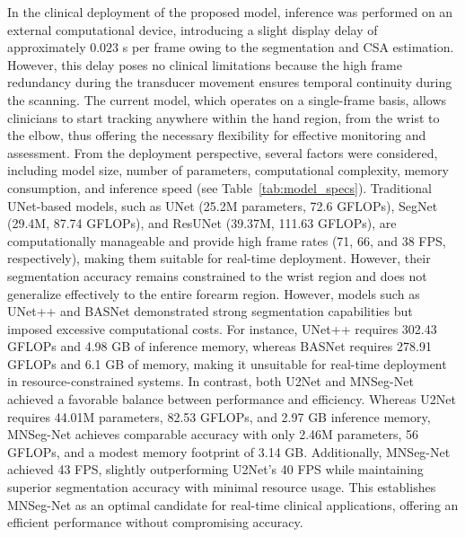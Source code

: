 In the clinical deployment of the proposed model, inference was performed on an external computational device, introducing a slight display delay of approximately $0.023$ s per frame owing to the segmentation and CSA estimation. However, this delay poses no clinical limitations because the high frame redundancy during the transducer movement ensures temporal continuity during the scanning.  The current model, which operates on a single-frame basis, allows clinicians to start tracking anywhere within the hand region, from the wrist to the elbow, thus offering the necessary flexibility for effective monitoring and assessment. From the deployment perspective, several factors were considered, including model size, number of parameters, computational complexity, memory consumption, and inference speed (see Table~\ref{tab:model_specs}). Traditional UNet-based models, such as UNet (25.2M parameters, 72.6 GFLOPs), SegNet (29.4M, 87.74 GFLOPs), and ResUNet (39.37M, 111.63 GFLOPs), are computationally manageable and provide high frame rates (71, 66, and 38 FPS, respectively), making them suitable for real-time deployment. However, their segmentation accuracy remains constrained to the wrist region and does not generalize effectively to the entire forearm region. However, models such as UNet++ and BASNet demonstrated strong segmentation capabilities but imposed excessive computational costs. For instance, UNet++ requires 302.43 GFLOPs and 4.98 GB of inference memory, whereas BASNet requires 278.91 GFLOPs and 6.1 GB of memory, making it unsuitable for real-time deployment in resource-constrained systems. In contrast, both U2Net and MNSeg-Net achieved a favorable balance between performance and efficiency. Whereas U2Net requires 44.01M parameters, 82.53 GFLOPs, and 2.97 GB inference memory, MNSeg-Net achieves comparable accuracy with only 2.46M parameters, 56 GFLOPs, and a modest memory footprint of 3.14 GB. Additionally, MNSeg-Net achieved 43 FPS, slightly outperforming U2Net’s 40 FPS while maintaining superior segmentation accuracy with minimal resource usage. This establishes MNSeg-Net as an optimal candidate for real-time clinical applications, offering an efficient performance without compromising accuracy.


